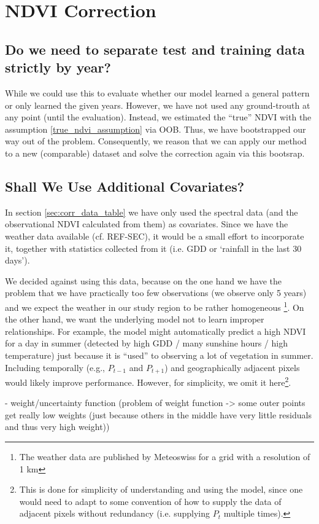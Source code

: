 \section{NDVI Correction}{
    \subsection{Do we need to separate test and training data strictly by year?}
        While we could use this to evaluate whether our model learned a general pattern or only learned the given years. However, we have not used any ground-trouth at any point (until the evaluation). Instead, we estimated the ``true'' NDVI with the assumption \ref{true_ndvi_assumption} via OOB. Thus, we have bootstrapped our way out of the problem. Consequently, we reason that we can apply our method to a new (comparable) dataset and solve the correction again via this bootsrap.
    \subsection{Shall We Use Additional Covariates?}{
        In section \ref{sec:corr_data_table} we have only used the spectral data (and the observational NDVI calculated from them) as covariates. Since we have the weather data available (cf. REF-SEC), it would be a small effort to incorporate it, together with statistics collected from it (i.e. GDD or `rainfall in the last 30 days'). 
    
        We decided against using this data, because on the one hand we have the problem that we have practically too few observations (we observe only 5 years) and we expect the weather in our study region to be rather homogeneous \footnote{The weather data are published by Meteoswiss for a grid with a resolution of 1 km}. On the other hand, we want the underlying model not to learn improper relationships. For example, the model might automatically predict a high NDVI for a day in summer (detected by high GDD / many sunshine hours / high temperature) just because it is ``used'' to observing a lot of vegetation in summer. 
        Including temporally (e.g., $P_{t-1}$ and $P_{t+1}$) and geographically adjacent pixels would likely improve performance. However, for simplicity, we omit it here\footnote{This is done for simplicity of understanding and using the model, since one would need to adapt to some convention of how to supply the data of adjacent pixels without redundancy (i.e. supplying $P_t$ multiple times).}.
    }

    - weight/uncertainty function 
    (problem of weight function -> some outer points get really low weights (just because others in the middle have very little residuals and thus very high weight))
}
